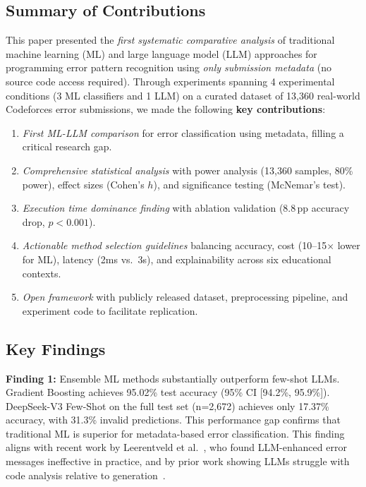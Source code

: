 \documentclass[10pt,a4paper]{article}
\begin{document}
\subsection*{Summary of Contributions}
This paper presented the \textit{first systematic comparative analysis} of
traditional machine learning (ML) and large language model (LLM) approaches
for programming error pattern recognition using \textit{only submission
metadata} (no source code access required). Through experiments spanning 4
experimental conditions (3 ML classifiers and 1 LLM) on a curated dataset of
13,360 real-world Codeforces error submissions, we made the following
\textbf{key contributions}:

\begin{enumerate}
    \item \textit{First ML-LLM comparison} for error classification using
          metadata, filling a critical research gap.
    \item \textit{Comprehensive statistical analysis} with power analysis
          (13,360 samples, 80\% power), effect sizes (Cohen's $h$), and
          significance testing (McNemar's test).
    \item \textit{Execution time dominance finding} with ablation validation
          (8.8\,pp accuracy drop, $p < 0.001$).
    \item \textit{Actionable method selection guidelines} balancing accuracy,
          cost (10--15$\times$ lower for ML), latency (2ms vs.\ 3s), and
          explainability across six educational contexts.
    \item \textit{Open framework} with publicly released dataset, preprocessing
          pipeline, and experiment code to facilitate replication.
\end{enumerate}

\subsection*{Key Findings}

\textbf{Finding 1:} Ensemble ML methods substantially outperform few-shot
LLMs. Gradient Boosting achieves 95.02\% test accuracy (95\% CI [94.2\%,
95.9\%]). DeepSeek-V3 Few-Shot on the full test set (n=2,672) achieves only
17.37\% accuracy, with 31.3\% invalid predictions. This performance gap
confirms that traditional ML is superior for metadata-based error
classification. This finding aligns with recent work by Leerentveld et
al.~\cite{leerentveld2024not}, who found LLM-enhanced error messages
ineffective in practice, and by prior work showing LLMs struggle with code analysis relative to
generation~\cite{kazemitabaar2024impact,finnie2022robots}.\\
\end{document}
